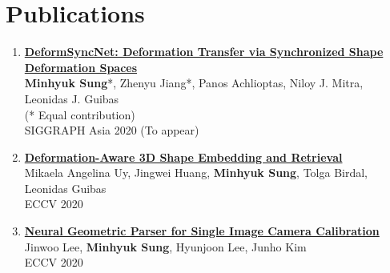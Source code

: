 \documentclass[letterpaper,10pt]{article} %
\newcommand{\blankline}{\quad\pagebreak[2]}
\begin{document}
{%
%
%
%



\section{Publications}

\begin{enumerate}
\item \label{siggraphasia20}
\href{https://mhsung.github.io/deform-sync-net.html}{\textbf{DeformSyncNet: Deformation Transfer via Synchronized Shape Deformation Spaces}}\\
\textbf{Minhyuk Sung}*, Zhenyu Jiang*, Panos Achlioptas, Niloy J. Mitra, Leonidas J. Guibas\\
(* Equal contribution)\\
SIGGRAPH Asia 2020 (To appear)\\
\blankline

\item \label{eccv20_4}
\href{https://deformscan2cad.github.io/}{\textbf{Deformation-Aware 3D Shape Embedding and Retrieval}}\\
Mikaela Angelina Uy, Jingwei Huang, \textbf{Minhyuk Sung}, Tolga Birdal, Leonidas Guibas\\
ECCV 2020\\
\blankline

\item \label{eccv20_3}
\href{https://arxiv.org/abs/2007.11855}{\textbf{Neural Geometric Parser for Single Image Camera Calibration}}\\
Jinwoo Lee, \textbf{Minhyuk Sung}, Hyunjoon Lee, Junho Kim\\
ECCV 2020\\
\blankline


\end{enumerate}}
\end{document}
